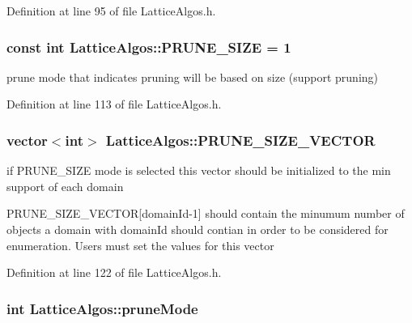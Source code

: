 Definition at line 95 of file LatticeAlgos.h.

\hypertarget{class_lattice_algos_a9a1d69347724b131f372706322776bbb}{
\subsubsection[{PRUNE\_\-SIZE}]{\setlength{\rightskip}{0pt plus 5cm}const int {\bf LatticeAlgos::PRUNE\_\-SIZE} = 1}}
\label{class_lattice_algos_a9a1d69347724b131f372706322776bbb}


prune mode that indicates pruning will be based on size (support pruning) 



Definition at line 113 of file LatticeAlgos.h.

\hypertarget{class_lattice_algos_a244d9a63307846c2df232091a78a6759}{
\subsubsection[{PRUNE\_\-SIZE\_\-VECTOR}]{\setlength{\rightskip}{0pt plus 5cm}vector$<$int$>$ {\bf LatticeAlgos::PRUNE\_\-SIZE\_\-VECTOR}}}
\label{class_lattice_algos_a244d9a63307846c2df232091a78a6759}


if PRUNE\_\-SIZE mode is selected this vector should be initialized to the min support of each domain 

PRUNE\_\-SIZE\_\-VECTOR\mbox{[}domainId-\/1\mbox{]} should contain the minumum number of objects a domain with domainId should contian in order to be considered for enumeration. Users must set the values for this vector 

Definition at line 122 of file LatticeAlgos.h.

\hypertarget{class_lattice_algos_a5a4badfea96f02f89d8943ca7fecc2ab}{
\subsubsection[{pruneMode}]{\setlength{\rightskip}{0pt plus 5cm}int {\bf LatticeAlgos::pruneMode}}}
\label{class_lattice_algos_a5a4badfea96f02f89d8943ca7fecc2ab}


